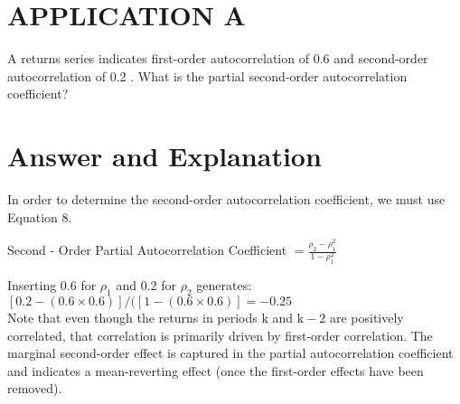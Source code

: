 \documentclass[11pt]{article}
\begin{document}
\section*{APPLICATION A}
A returns series indicates first-order autocorrelation of 0.6 and second-order autocorrelation of 0.2 . What is the partial second-order autocorrelation coefficient?

\section*{Answer and Explanation}
In order to determine the second-order autocorrelation coefficient, we must use Equation 8.

Second - Order Partial Autocorrelation Coefficient $=\frac{\rho_{2}-\rho_{1}^{2}}{1-\rho_{1}^{2}}$

Inserting 0.6 for $\rho_{1}$ and 0.2 for $\rho_{2}$ generates: $[0.2-(0.6 \times 0.6)] /([1-(0.6 \times 0.6)]=-0.25$\\
Note that even though the returns in periods $\mathrm{k}$ and $\mathrm{k}-2$ are positively correlated, that correlation is primarily driven by first-order correlation. The marginal second-order effect is captured in the partial autocorrelation coefficient and indicates a mean-reverting effect (once the first-order effects have been removed).
\end{document}
